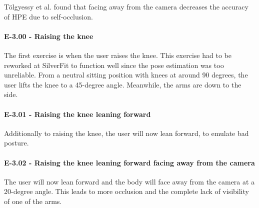 Tölgyessy et al. found that facing away from the camera decreases the accuracy of HPE due to self-occlusion. \cite{HPEIsHard}

\paragraph{E-3.00 - Raising the knee}

The first exercise is when the user raises the knee. This exercise had to be reworked at SilverFit to function well since the pose estimation was too unreliable. From a neutral sitting position with knees at around 90 degrees, the user lifts the knee to a 45-degree angle. Meanwhile, the arms are down to the side.

\paragraph{E-3.01 - Raising the knee leaning forward}

Additionally to raising the knee, the user will now lean forward, to emulate bad posture.

\paragraph{E-3.02 - Raising the knee leaning forward facing away from the camera}

The user will now lean forward and the body will face away from the camera at a 20-degree angle. This leads to more occlusion and the complete lack of visibility of one of the arms. 